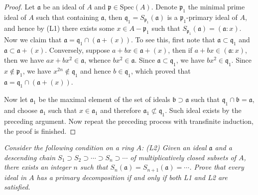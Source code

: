 \begin{proof}
Let $\mathfrak{a}$ be an ideal of $A$ and $\mathfrak{p}\in\mathrm{Spec}(A)$. Denote $\mathfrak{p}_1$ the minimal prime ideal of $A$ such that containing $\mathfrak{a}$, then $\mathfrak{q}_1=S_{\mathfrak{p}_1}(\mathfrak{a})$ is a $\mathfrak{p}_1$-primary ideal of $A$, and hence by (L1) there exists some $x\in A-\mathfrak{p}_1$ such that $S_{\mathfrak{p}_1}(\mathfrak{a})=(\mathfrak{a}:x)$. Now we claim that $\mathfrak{a}=\mathfrak{q}_1\cap(\mathfrak{a}+(x))$. To see this, first note that $\mathfrak{a}\subset\mathfrak{q}_1$ and $\mathfrak{a}\subset\mathfrak{a}+(x)$. Conversely, suppose $a+bx\in\mathfrak{a}+(x)$, then if $a+bx\in(\mathfrak{a}:x)$, then we have $ax+bx^2\in\mathfrak{a}$, whence $bx^2\in\mathfrak{a}$. Since $\mathfrak{a}\subset\mathfrak{q}_1$, we have $bx^2\in\mathfrak{q}_1$. Since $x\notin\mathfrak{p}_1$, we have $x^{2n}\notin\mathfrak{q}_1$ and hence $b\in\mathfrak{q}_1$, which proved that $\mathfrak{a}=\mathfrak{q}_1\cap(\mathfrak{a}+(x))$.\par
Now let $\mathfrak{a}_1$ be the maximal element of the set of ideals $\mathfrak{b}\supset\mathfrak{a}$ such that $\mathfrak{q}_1\cap\mathfrak{b}=\mathfrak{a}$, and choose $\mathfrak{a}_1$ such that $x\in\mathfrak{a}_1$ and therefore $\mathfrak{a}_1\not\subset\mathfrak{q}_1$. Such ideal exists by the preceding argument. Now repeat the preceding process with transfinite induction, the proof is finished.
\end{proof}
\begin{problem}\em
Consider the following condition on a ring $A$: (L2) Given an ideal $\mathfrak{a}$ and a descending chain $S_1\supset S_2\supset\cdots\supset S_n\supset\cdots$ of multiplicatively closed subsets of $A$, there exists an integer $n$ such that $S_n(\mathfrak{a})=S_{n+1}(\mathfrak{a})=\cdots$. Prove that every ideal in $A$ has a primary decomposition if and only if both L1 and L2 are satisfied.
\end{problem}
